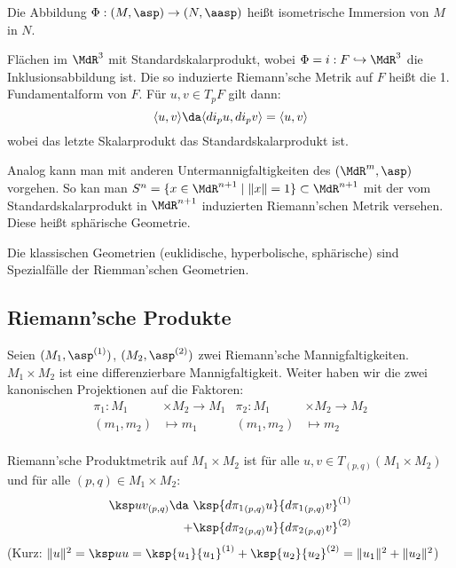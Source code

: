 \documentclass[a4paper,twoside,DIV15,BCOR12mm]{scrbook}
\begin{document}
Die Abbildung $\Phi: (M,\asp) \to (N,\aasp)$ heißt isometrische Immersion von $M$ in $N$.

\begin{beispiel}
Flächen im $\MdR^3$ mit Standardskalarprodukt, wobei $\Phi=i: F \hookrightarrow \MdR^3$ die Inklusionsabbildung ist. Die so induzierte Riemann’sche Metrik auf $F$ heißt die 1. Fundamentalform von $F$. Für $u,v \in T_pF$ gilt dann:
\[
\langle u,v\rangle \da \langle di_pu, di_pv\rangle = \langle u, v\rangle
\]
wobei das letzte Skalarprodukt das Standardskalarprodukt ist.
\end{beispiel}

Analog kann man mit anderen Untermannigfaltigkeiten des $(\MdR^m,\asp)$ vorgehen. So kan man $S^n = \{x\in\MdR^{n+1}\mid \|x\|=1\}\subset \MdR^{n+1}$ mit der vom Standardskalarprodukt in $\MdR^{n+1}$ induzierten Riemann’schen Metrik versehen. Diese heißt sphärische Geometrie.

\begin{bemerkung}
Die klassischen Geometrien (euklidische, hyperbolische, sphärische) sind Spezialfälle der Riemman’schen Geometrien.
\end{bemerkung}

\subsection{Riemann’sche Produkte}
Seien $(M_1, \asp^{(1)})$, $(M_2, \asp^{(2)})$ zwei Riemann’sche Mannigfaltigkeiten. $M_1\times M_2$ ist eine differenzierbare Mannigfaltigkeit. Weiter haben wir die zwei kanonischen Projektionen auf die Faktoren:
\begin{align*}
\pi_1: M_1&\times M_2 \to M_1 &
\pi_2: M_1&\times M_2 \to M_2 \\
(m_1,m_2) &\mapsto m_1 &
(m_1,m_2) &\mapsto m_2 \\
\end{align*}

\begin{definition}
Riemann’sche Produktmetrik auf $M_1\times M_2$ ist für alle $u,v\in T_{(p,q)}(M_1\times M_2)$ und für alle $(p,q)\in M_1\times M_2$:
\begin{align*}
\ksp uv_{(p,q)} \da \ & \ksp {d{\pi_1}_{(p,q)} u}{ d{\pi_1}_{(p,q)}v}^{(1)} \\
+ &\ksp {d{\pi_2}_{(p,q)} u}{ d{\pi_2}_{(p,q)}v}^{(2)}
\end{align*}
(Kurz: $\|u\|^2 = \ksp uu = \ksp {u_1}{u_1}^{(1)} + \ksp {u_2}{u_2}^{(2)} = \|u_1\|^2 + \|u_2\|^2$)
\end{definition}
\end{document}

